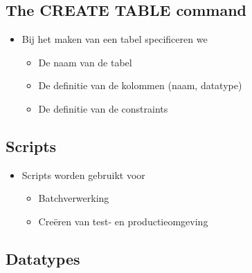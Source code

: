 \documentclass{report}
\begin{document}
    \subsection{The CREATE TABLE command}
    \begin{itemize}  
        \item Bij het maken van een tabel specificeren we
        \begin{itemize}
            \item De naam van de tabel
            \item De definitie van de kolommen (naam, datatype)
            \item De definitie van de constraints
        \end{itemize}
    \end{itemize}

    \subsection{Scripts}
    \begin{itemize}  
        \item Scripts worden gebruikt voor
        \begin{itemize}
            \item Batchverwerking
            \item Creëren van test- en productieomgeving
        \end{itemize}
    \end{itemize}

    \subsection{Datatypes}
\end{document}
